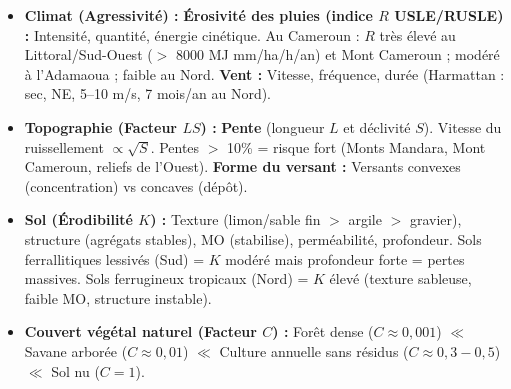 \documentclass[11pt]{article}
\begin{document}
\begin{propriete}
\begin{itemize}
    \item \textbf{Climat (Agressivité) :} \textbf{Érosivité des pluies (indice $R$ USLE/RUSLE) :} Intensité, quantité, énergie cinétique. Au Cameroun : $R$ très élevé au Littoral/Sud-Ouest ($>$ 8000 MJ mm/ha/h/an) et Mont Cameroun ; modéré à l'Adamaoua ; faible au Nord. \textbf{Vent :} Vitesse, fréquence, durée (Harmattan : sec, NE, 5--10 m/s, 7 mois/an au Nord).
    \item \textbf{Topographie (Facteur $LS$) :} \textbf{Pente} (longueur $L$ et déclivité $S$). Vitesse du ruissellement $\propto \sqrt{S}$. Pentes $>$ 10\% = risque fort (Monts Mandara, Mont Cameroun, reliefs de l'Ouest). \textbf{Forme du versant :} Versants convexes (concentration) vs concaves (dépôt).
    \item \textbf{Sol (Érodibilité $K$) :} Texture (limon/sable fin $>$ argile $>$ gravier), structure (agrégats stables), MO (stabilise), perméabilité, profondeur. Sols ferrallitiques lessivés (Sud) = $K$ modéré mais profondeur forte = pertes massives. Sols ferrugineux tropicaux (Nord) = $K$ élevé (texture sableuse, faible MO, structure instable).
    \item \textbf{Couvert végétal naturel (Facteur $C$) :} Forêt dense ($C \approx 0,001$) $\ll$ Savane arborée ($C \approx 0,01$) $\ll$ Culture annuelle sans résidus ($C \approx 0,3-0,5$) $\ll$ Sol nu ($C = 1$).
\end{itemize}
\end{propriete}
\end{document}
